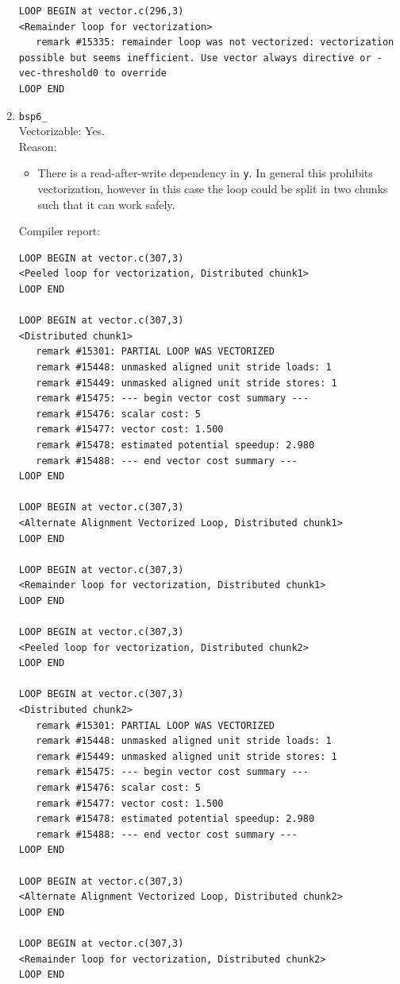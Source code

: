 \documentclass[11pt]{article}
\begin{document}
\begin{enumerate}
\begin{lstlisting}
LOOP BEGIN at vector.c(296,3)
<Remainder loop for vectorization>
   remark #15335: remainder loop was not vectorized: vectorization possible but seems inefficient. Use vector always directive or -vec-threshold0 to override 
LOOP END
\end{lstlisting}

\item \texttt{bsp6\_}\\
Vectorizable: Yes.\\
Reason:
\begin{itemize}
\item There is a read-after-write dependency in \texttt{y}. In general this prohibits vectorization, however in this case the loop could be split in two chunks such that it can work safely.
\end{itemize}
Compiler report:
\begin{lstlisting}
LOOP BEGIN at vector.c(307,3)
<Peeled loop for vectorization, Distributed chunk1>
LOOP END

LOOP BEGIN at vector.c(307,3)
<Distributed chunk1>
   remark #15301: PARTIAL LOOP WAS VECTORIZED
   remark #15448: unmasked aligned unit stride loads: 1 
   remark #15449: unmasked aligned unit stride stores: 1 
   remark #15475: --- begin vector cost summary ---
   remark #15476: scalar cost: 5 
   remark #15477: vector cost: 1.500 
   remark #15478: estimated potential speedup: 2.980 
   remark #15488: --- end vector cost summary ---
LOOP END

LOOP BEGIN at vector.c(307,3)
<Alternate Alignment Vectorized Loop, Distributed chunk1>
LOOP END

LOOP BEGIN at vector.c(307,3)
<Remainder loop for vectorization, Distributed chunk1>
LOOP END

LOOP BEGIN at vector.c(307,3)
<Peeled loop for vectorization, Distributed chunk2>
LOOP END

LOOP BEGIN at vector.c(307,3)
<Distributed chunk2>
   remark #15301: PARTIAL LOOP WAS VECTORIZED
   remark #15448: unmasked aligned unit stride loads: 1 
   remark #15449: unmasked aligned unit stride stores: 1 
   remark #15475: --- begin vector cost summary ---
   remark #15476: scalar cost: 5 
   remark #15477: vector cost: 1.500 
   remark #15478: estimated potential speedup: 2.980 
   remark #15488: --- end vector cost summary ---
LOOP END

LOOP BEGIN at vector.c(307,3)
<Alternate Alignment Vectorized Loop, Distributed chunk2>
LOOP END

LOOP BEGIN at vector.c(307,3)
<Remainder loop for vectorization, Distributed chunk2>
LOOP END
\end{lstlisting}


\end{enumerate}
\end{document}
